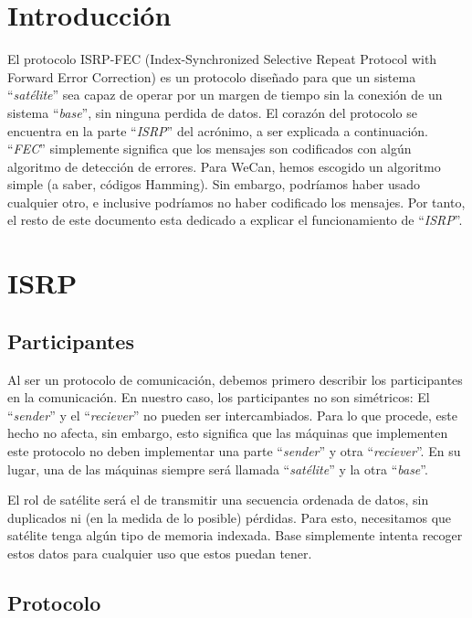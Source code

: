 \documentclass{article}
\begin{document}
\section{Introducción}

El protocolo ISRP-FEC (Index-Synchronized Selective Repeat Protocol with Forward Error Correction) es un protocolo diseñado para que un sistema ``\textit{satélite}'' sea capaz de operar por un margen de tiempo sin la conexión de un sistema ``\textit{base}'', sin ninguna perdida de datos. El corazón del protocolo se encuentra en la parte ``\textit{ISRP}'' del acrónimo, a ser explicada a continuación. ``\textit{FEC}'' simplemente significa que los mensajes son codificados con algún algoritmo de detección de errores. Para WeCan, hemos escogido un algoritmo simple (a saber, códigos Hamming). Sin embargo, podríamos haber usado cualquier otro, e inclusive podríamos no haber codificado los mensajes. Por tanto, el resto de este documento esta dedicado a explicar el funcionamiento de ``\textit{ISRP}''.

\section{ISRP}

\subsection{Participantes}

Al ser un protocolo de comunicación, debemos primero describir los participantes en la comunicación. En nuestro caso, los participantes no son simétricos: El ``\textit{sender}'' y el ``\textit{reciever}'' no pueden ser intercambiados. Para lo que procede, este hecho no afecta, sin embargo, esto significa que las máquinas que implementen este protocolo no deben implementar una parte ``\textit{sender}'' y otra ``\textit{reciever}''. En su lugar, una de las máquinas siempre será llamada ``\textit{satélite}'' y la otra ``\textit{base}''.

El rol de satélite será el de transmitir una secuencia ordenada de datos, sin duplicados ni (en la medida de lo posible) pérdidas. Para esto, necesitamos que satélite tenga algún tipo de memoria indexada. Base simplemente intenta recoger estos datos para cualquier uso que estos puedan tener.

\subsection{Protocolo}
\end{document}
